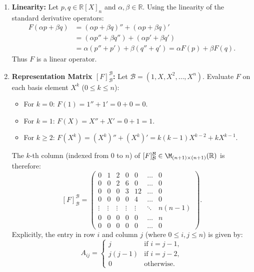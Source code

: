 \begin{exercisesolution}
\label{sol:polynomial_differential_operator_matrix}
\begin{enumerate}[label=\textbf{(\alph*)}]
    \item \textbf{Linearity:}
    Let $p, q \in \mathbb{R}[X]_n$ and $\alpha, \beta \in \mathbb{R}$. Using the linearity of the standard derivative operators:
    \begin{align*}
    F(\alpha p + \beta q) &= (\alpha p + \beta q)'' + (\alpha p + \beta q)' \\
    &= (\alpha p'' + \beta q'') + (\alpha p' + \beta q') \\
    &= \alpha (p'' + p') + \beta (q'' + q') = \alpha F(p) + \beta F(q).
    \end{align*}
    Thus $F$ is a linear operator.

    \item \textbf{Representation Matrix $[F]_{\mathcal{B}}^{\mathcal{B}}$:}
    Let $\mathcal{B} = (1, X, X^2, \dots, X^n)$. Evaluate $F$ on each basis element $X^k$ ($0 \le k \le n$):
    \begin{itemize}
        \item For $k = 0$: $F(1) = 1'' + 1' = 0 + 0 = 0$.
        \item For $k = 1$: $F(X) = X'' + X' = 0 + 1 = 1$.
        \item For $k \ge 2$: $F(X^k) = (X^k)'' + (X^k)' = k(k-1)X^{k-2} + kX^{k-1}$.
    \end{itemize}
    The $k$-th column (indexed from $0$ to $n$) of $[F]_{\mathcal{B}}^{\mathcal{B}} \in \M_{(n+1) \times (n+1)}(\mathbb{R})$ is therefore:
    \[
    [F]_{\mathcal{B}}^{\mathcal{B}} =
    \begin{pmatrix}
    0 & 1 & 2 & 0 & 0 & \dots & 0 \\
    0 & 0 & 2 & 6 & 0 & \dots & 0 \\
    0 & 0 & 0 & 3 & 12 & \dots & 0 \\
    0 & 0 & 0 & 0 & 4 & \dots & 0 \\
    \vdots & \vdots & \vdots & \vdots & \vdots & \ddots & n(n-1) \\
    0 & 0 & 0 & 0 & 0 & \dots & n \\
    0 & 0 & 0 & 0 & 0 & \dots & 0
    \end{pmatrix}.
    \]
    Explicitly, the entry in row $i$ and column $j$ (where $0 \le i, j \le n$) is given by:
    \[
    A_{ij} = \begin{cases}
    j & \text{if } i = j - 1, \\
    j(j-1) & \text{if } i = j - 2, \\
    0 & \text{otherwise.}
    \end{cases}
    \]
\end{enumerate}
\end{exercisesolution}

